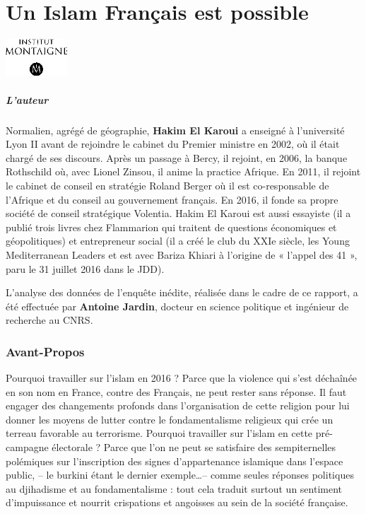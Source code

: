\chapter{Un Islam Français est possible}
\begin{marginfigure}
\includegraphics[width=0.91222in,height=0.54469in]{ImageIslamFrance/media/image6.png}

\end{marginfigure}

\hypertarget{lauteur}{%
\paragraph{L'auteur}\label{lauteur}}
Normalien, agrégé de géographie, \textbf{Hakim El Karoui} a enseigné à
l'université Lyon II avant de rejoindre le cabinet du Premier ministre
en 2002, où il était chargé de ses discours. Après un passage à Bercy,
il rejoint, en 2006, la banque Rothschild où, avec Lionel Zinsou, il
anime la practice Afrique. En 2011, il rejoint le cabinet de conseil en
stratégie Roland Berger où il est co-responsable de l'Afrique et du
conseil au gouvernement français. En 2016, il fonde sa propre société de
conseil stratégique Volentia. Hakim El Karoui est aussi essayiste (il a
publié trois livres chez Flammarion qui traitent de questions
économiques et géopolitiques) et entrepreneur social (il a créé le club
du XXIe siècle, les Young Mediterranean Leaders et est avec Bariza
Khiari à l'origine de « l'appel des 41 », paru le 31 juillet 2016 dans
le JDD).

L'analyse des données de l'enquête inédite, réalisée dans le cadre de ce
rapport, a été effectuée par \textbf{Antoine Jardin}, docteur en science
politique et ingénieur de recherche au CNRS.




\subsection{Avant-Propos}


Pourquoi travailler sur l'islam en 2016 ? Parce que la violence qui
s'est déchaînée en son nom en France, contre des Français, ne peut
rester sans réponse. Il faut engager des changements profonds dans
l'organisation de cette religion pour lui donner les moyens de lutter
contre le fondamentalisme religieux qui crée un terreau favorable au
terrorisme. Pourquoi travailler sur l'islam en cette pré-campagne
électorale ? Parce que l'on ne peut se satisfaire des sempiternelles
polémiques sur l'inscription des signes d'appartenance islamique dans
l'espace public, -- le burkini étant le dernier exemple\ldots-- comme
seules réponses politiques au djihadisme et au fondamentalisme : tout
cela traduit surtout un sentiment d'impuissance et nourrit crispations
et angoisses au sein de la société française.


